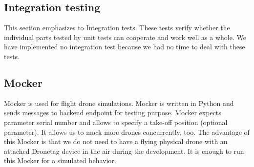 \subsection{Integration testing}\label{subsec:integration-testing}
This section emphasizes to Integration tests.
These tests verify whether the individual parts tested by unit tests can cooperate and work well as a whole.
We have implemented no integration test because we had no time to deal with these tests.


\subsection{Mocker}\label{subsec:mocker}
Mocker is used for flight drone simulations.
Mocker is written in Python and sends messages to backend endpoint for testing purpose.
Mocker expects parameter serial number and allows to specify a take-off position (optional parameter).
It allows us to mock more drones concurrently, too.
The advantage of this Mocker is that we do not need to have a flying physical drone with an attached Dronetag device in the air during the development.
It is enough to run this Mocker for a simulated behavior.
